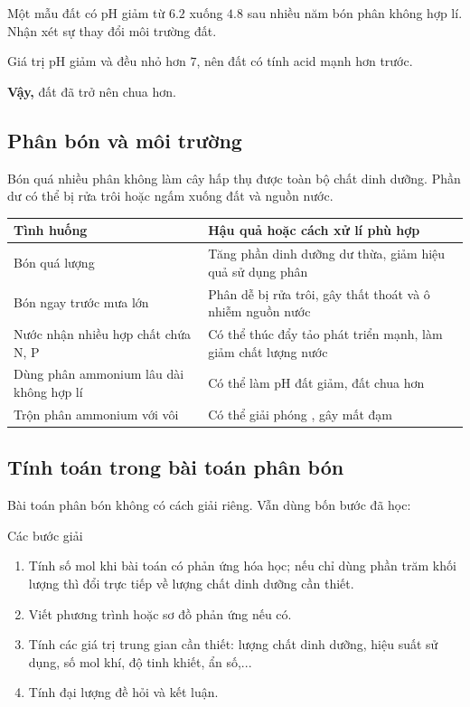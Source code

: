 \begin{vidu}
Một mẫu đất có pH giảm từ $6.2$ xuống $4.8$ sau nhiều năm bón phân không hợp lí. Nhận xét sự thay đổi môi trường đất.
\end{vidu}
\begin{loigiai}
Giá trị pH giảm và đều nhỏ hơn $7$, nên đất có tính acid mạnh hơn trước.

\textbf{Vậy,} đất đã trở nên chua hơn.
\end{loigiai}

\subsection{Phân bón và môi trường}

Bón quá nhiều phân không làm cây hấp thụ được toàn bộ chất dinh dưỡng. Phần dư có thể bị rửa trôi hoặc ngấm xuống đất và nguồn nước.

\begin{center}
\begin{tabularx}{0.96\textwidth}{Y Y}
\toprule
Tình huống & Hậu quả hoặc cách xử lí phù hợp \\
\midrule
Bón quá lượng & Tăng phần dinh dưỡng dư thừa, giảm hiệu quả sử dụng phân \\
Bón ngay trước mưa lớn & Phân dễ bị rửa trôi, gây thất thoát và ô nhiễm nguồn nước \\
Nước nhận nhiều hợp chất chứa N, P & Có thể thúc đẩy tảo phát triển mạnh, làm giảm chất lượng nước \\
Dùng phân ammonium lâu dài không hợp lí & Có thể làm pH đất giảm, đất chua hơn \\
Trộn phân ammonium với vôi & Có thể giải phóng , gây mất đạm \\
\bottomrule
\end{tabularx}
\end{center}

\subsection{Tính toán trong bài toán phân bón}

Bài toán phân bón không có cách giải riêng. Vẫn dùng bốn bước đã học:

\begin{ghinho}{Các bước giải}
\begin{enumerate}
\item Tính số mol khi bài toán có phản ứng hóa học; nếu chỉ dùng phần trăm khối lượng thì đổi trực tiếp về lượng chất dinh dưỡng cần thiết.
\item Viết phương trình hoặc sơ đồ phản ứng nếu có.
\item Tính các giá trị trung gian cần thiết: lượng chất dinh dưỡng, hiệu suất sử dụng, số mol khí, độ tinh khiết, ẩn số,...
\item Tính đại lượng đề hỏi và kết luận.
\end{enumerate}
\end{ghinho}

